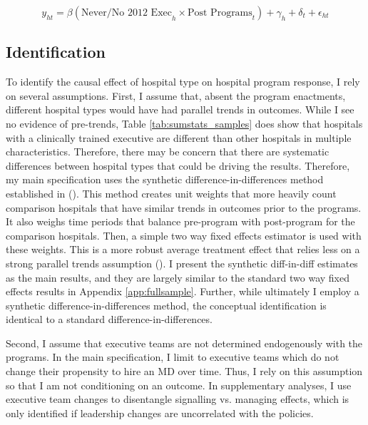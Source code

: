 \documentclass[12pt]{article}
\begin{document}
    \begin{equation}
    \label{eq:decomp}
    y_{ht} = \beta (\text{Never/No 2012 Exec}_h \times \text{Post Programs}_t) + \gamma_{h} + \delta_t + \epsilon_{ht}
    \end{equation}

    \subsection{Identification}\label{sec:identification}

    To identify the causal effect of hospital type on hospital program response, I rely on several assumptions. First, I assume that, absent the program enactments, different hospital types would have had parallel trends in outcomes. While I see no evidence of pre-trends, Table \ref{tab:sumstats_samples} does show that hospitals with a clinically trained executive are different than other hospitals in multiple characteristics. Therefore, there may be concern that there are systematic differences between hospital types that could be driving the results. Therefore, my main specification uses the synthetic difference-in-differences method established in \citeauthor{arkhangelsky2021synthetic} (\citeyear{arkhangelsky2021synthetic}). This method creates unit weights that more heavily count comparison hospitals that have similar trends in outcomes prior to the programs. It also weighs time periods that balance pre-program with post-program for the comparison hospitals. Then, a simple two way fixed effects estimator is used with these weights. This is a more robust average treatment effect that relies less on a strong parallel trends assumption (\cite{arkhangelsky2021synthetic}). I present the synthetic diff-in-diff estimates as the main results, and they are largely similar to the standard two way fixed effects results in Appendix \ref{app:fullsample}. Further, while ultimately I employ a synthetic difference-in-differences method, the conceptual identification is identical to a standard difference-in-differences.

     Second, I assume that executive teams are not determined endogenously with the programs. In the main specification, I limit to executive teams which do not change their propensity to hire an MD over time. Thus, I rely on this assumption so that I am not conditioning on an outcome. In supplementary analyses, I use executive team changes to disentangle signalling vs. managing effects, which is only identified if leadership changes are uncorrelated with the policies. 
\end{document}
